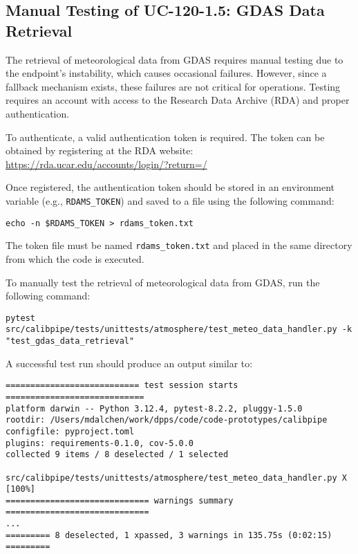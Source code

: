 \subsection{Manual Testing of UC-120-1.5: GDAS Data Retrieval}

The retrieval of meteorological data from GDAS requires manual testing due to the endpoint's instability, which causes occasional failures.
However, since a fallback mechanism exists, these failures are not critical for operations. Testing requires an account with access to the Research Data Archive (RDA) and proper authentication.

To authenticate, a valid authentication token is required. The token can be obtained by registering at the RDA website:
\url{https://rda.ucar.edu/accounts/login/?return=/}

Once registered, the authentication token should be stored in an environment variable (e.g., \texttt{RDAMS\_TOKEN}) and saved to a file using the following command:

\begin{verbatim}
echo -n $RDAMS_TOKEN > rdams_token.txt
\end{verbatim}

The token file must be named \texttt{rdams\_token.txt} and placed in the same directory from which the code is executed.

To manually test the retrieval of meteorological data from GDAS, run the following command:

\begin{verbatim}
pytest src/calibpipe/tests/unittests/atmosphere/test_meteo_data_handler.py -k "test_gdas_data_retrieval"
\end{verbatim}

A successful test run should produce an output similar to:

\begin{verbatim}
=========================== test session starts ============================
platform darwin -- Python 3.12.4, pytest-8.2.2, pluggy-1.5.0
rootdir: /Users/mdalchen/work/dpps/code/code-prototypes/calibpipe
configfile: pyproject.toml
plugins: requirements-0.1.0, cov-5.0.0
collected 9 items / 8 deselected / 1 selected

src/calibpipe/tests/unittests/atmosphere/test_meteo_data_handler.py X [100%]
============================= warnings summary =============================
...
========= 8 deselected, 1 xpassed, 3 warnings in 135.75s (0:02:15) =========
\end{verbatim}

